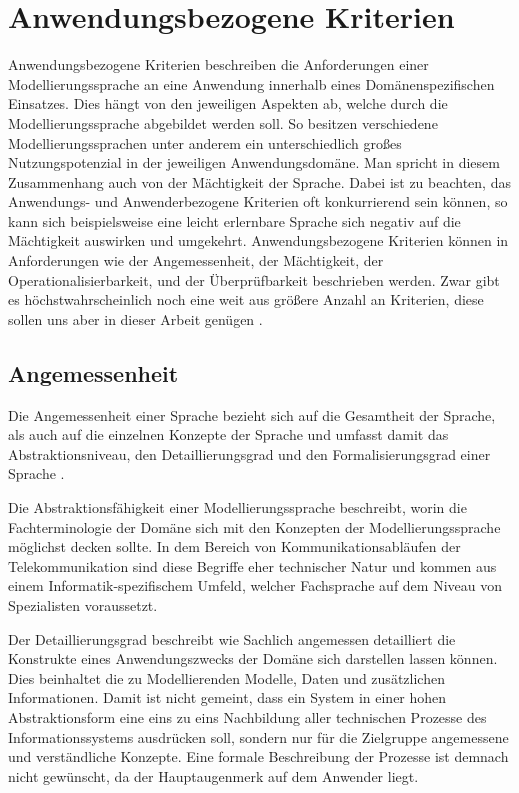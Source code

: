 \section{Anwendungsbezogene Kriterien}
\label{sc:AnwendungsbezogeneKriterien}
Anwendungsbezogene Kriterien beschreiben die Anforderungen einer Modellierungssprache an eine Anwendung innerhalb eines Domänenspezifischen Einsatzes.
Dies hängt von den jeweiligen Aspekten ab, welche durch die Modellierungssprache abgebildet werden soll.
So besitzen verschiedene Modellierungssprachen unter anderem ein unterschiedlich großes Nutzungspotenzial in der jeweiligen Anwendungsdomäne.
Man spricht in diesem Zusammenhang auch von der Mächtigkeit der Sprache.
Dabei ist zu beachten, das Anwendungs- und Anwenderbezogene Kriterien oft konkurrierend sein können,
so kann sich beispielsweise eine leicht erlernbare Sprache sich negativ auf die Mächtigkeit auswirken und umgekehrt.
Anwendungsbezogene Kriterien können in Anforderungen wie der Angemessenheit, der Mächtigkeit, der Operationalisierbarkeit,
und der Überprüfbarkeit beschrieben werden.
Zwar gibt es höchstwahrscheinlich noch eine weit aus größere Anzahl an Kriterien, diese sollen uns aber in dieser Arbeit genügen \cite[95\psq]{JaneFröming_2009}.
\subsection{Angemessenheit}
\label{ssc:Angemessenheit}
Die Angemessenheit einer Sprache bezieht sich auf die Gesamtheit der Sprache,
als auch auf die einzelnen Konzepte der Sprache und umfasst damit das Abstraktionsniveau, den Detaillierungsgrad und den Formalisierungsgrad einer Sprache \cite[97]{Lobe_2015}.

Die Abstraktionsfähigkeit einer Modellierungssprache beschreibt, worin die Fachterminologie der Domäne sich mit den Konzepten der Modellierungssprache möglichst decken sollte. In dem Bereich von Kommunikationsabläufen der Telekommunikation sind diese Begriffe eher technischer Natur und kommen aus einem Informatik-spezifischem Umfeld, welcher Fachsprache auf dem Niveau von Spezialisten voraussetzt. 

Der Detaillierungsgrad beschreibt wie Sachlich angemessen detailliert die Konstrukte eines Anwendungszwecks der Domäne sich darstellen lassen können. Dies beinhaltet die zu Modellierenden Modelle, Daten und zusätzlichen Informationen. Damit ist nicht gemeint, dass ein System in einer hohen Abstraktionsform eine eins zu eins Nachbildung aller technischen Prozesse des Informationssystems ausdrücken soll,
sondern nur für die Zielgruppe angemessene und verständliche Konzepte. Eine formale Beschreibung der Prozesse ist demnach nicht gewünscht, da der Hauptaugenmerk auf dem Anwender liegt.

